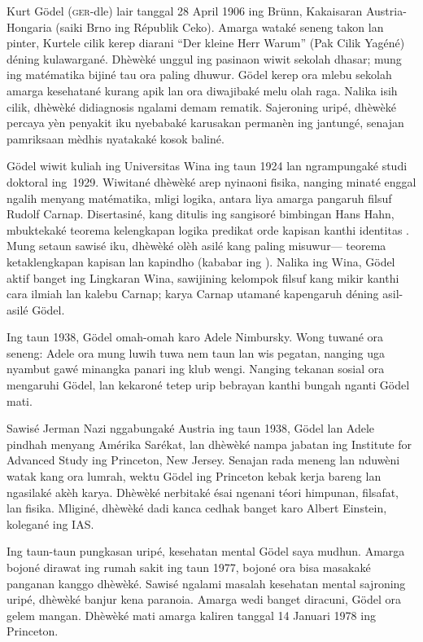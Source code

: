 \documentclass[../../../include/open-logic-section]{subfiles}
\begin{document}



Kurt G{\"o}del (\textsc{ger}-dle) lair tanggal 28 April
1906 ing Br{\"u}nn, Kakaisaran Austria-Hongaria
(saiki Brno ing Républik Ceko). Amarga wataké
seneng takon lan pinter, Kurtele cilik kerep
diarani ``Der kleine Herr Warum'' (Pak Cilik
Yagéné) déning kulawargané. Dhèwèké unggul ing
pasinaon wiwit sekolah dhasar; mung ing
matématika bijiné tau ora paling dhuwur.
G{\"o}del kerep ora mlebu sekolah amarga
kesehatané kurang apik lan ora diwajibaké
melu olah raga. Nalika isih cilik, dhèwèké
didiagnosis ngalami demam rematik. Sajeroning
uripé, dhèwèké percaya yèn penyakit iku
nyebabaké karusakan permanèn ing jantungé,
senajan pamriksaan mèdhis nyatakaké kosok
baliné.

G{\"o}del wiwit kuliah ing Universitas Wina
ing taun 1924 lan ngrampungaké studi
doktoral ing~1929. Wiwitané dhèwèké arep
nyinaoni fisika, nanging minaté enggal
ngalih menyang matématika, mligi logika,
antara liya amarga pangaruh filsuf
Rudolf Carnap. Disertasiné, kang ditulis
ing sangisoré bimbingan Hans Hahn,
mbuktekaké teorema kelengkapan logika
predikat orde kapisan kanthi identitas
\citep{Godel1929}. Mung setaun sawisé iku,
dhèwèké olèh asilé kang paling misuwur---
teorema ketaklengkapan kapisan lan kapindho
(kababar ing \citealt{Godel1931}).
Nalika ing Wina, G{\"o}del aktif banget
ing Lingkaran Wina, sawijining kelompok
filsuf kang mikir kanthi cara ilmiah lan
kalebu Carnap; karya Carnap utamané
kapengaruh déning asil-asilé G{\"o}del.

Ing taun 1938, G\"odel omah-omah karo Adele
Nimbursky. Wong tuwané ora seneng:
Adele ora mung luwih tuwa nem taun lan
wis pegatan, nanging uga nyambut gawé
minangka panari ing klub wengi.
Nanging tekanan sosial ora mengaruhi
G{\"o}del, lan kekaroné tetep urip
bebrayan kanthi bungah nganti Gödel mati.

Sawisé Jerman Nazi nggabungaké Austria
ing taun 1938, G{\"o}del lan Adele
pindhah menyang Amérika Sarékat, lan
dhèwèké nampa jabatan ing Institute
for Advanced Study ing Princeton,
New Jersey. Senajan rada meneng lan nduwèni
watak kang ora lumrah, wektu G{\"o}del
ing Princeton kebak kerja bareng lan
ngasilaké akèh karya. Dhèwèké
nerbitaké ésai ngenani téori himpunan,
filsafat, lan fisika. Mliginé,
dhèwèké dadi kanca cedhak banget
karo Albert Einstein, kolegané ing IAS.

Ing taun-taun pungkasan uripé,
kesehatan mental G{\"o}del saya
mudhun. Amarga bojoné dirawat
ing rumah sakit ing taun 1977,
bojoné ora bisa masakaké panganan
kanggo dhèwèké. Sawisé ngalami
masalah kesehatan mental sajroning
uripé, dhèwèké banjur kena
paranoia. Amarga wedi banget
diracuni, G{\"o}del ora gelem
mangan. Dhèwèké mati amarga
kaliren tanggal 14 Januari 1978
ing Princeton.
\end{document}

